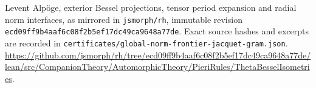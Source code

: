 Levent Alp\"oge, exterior Bessel projections, tensor period
expansion and radial norm interfaces, as mirrored in
\texttt{jsmorph/rh}, immutable revision
\texttt{ecd09ff9b4aaf6c08f2b5ef17dc49ca9648a77de}.
Exact source hashes and excerpts are recorded in
\texttt{certificates/global-norm-frontier-jacquet-gram.json}.
\url{https://github.com/jsmorph/rh/tree/ecd09ff9b4aaf6c08f2b5ef17dc49ca9648a77de/lean/src/CompanionTheory/AutomorphicTheory/PieriRules/ThetaBesselIsometries}.
